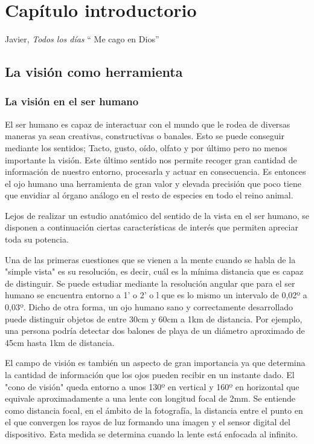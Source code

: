 \chapter{ Capítulo introductorio}

\begin{chapquote}{Javier, \textit{Todos los días}}
`` Me cago en Dios''
\end{chapquote}

\section{La visión como herramienta}

\subsection{La visión en el ser humano}
El ser humano es capaz de interactuar con el mundo que le rodea de diversas maneras ya sean creativas, constructivas o banales. Esto se puede conseguir mediante los sentidos; Tacto, gusto, oído, olfato y por último pero no menos importante la visión. Este último sentido nos permite recoger gran cantidad de información de nuestro entorno, procesarla y actuar en consecuencia. Es entonces el ojo humano una herramienta de gran valor y elevada precisión que poco tiene que envidiar al órgano análogo en el resto de especies en todo el reino animal. 

Lejos de realizar un estudio anatómico del sentido de la vista en el ser humano, se disponen a continuación ciertas características de interés que permiten apreciar toda su potencia.

Una de las primeras cuestiones que se vienen a la mente cuando se habla de la "simple vista" es su resolución, es decir, cuál es la mínima distancia que es capaz de distinguir. Se puede estudiar mediante la resolución angular que para el ser humano se encuentra entorno a 1' o 2' o l que es lo mismo un intervalo de 0,02º a 0,03º\cite{simple_vista}. Dicho de otra forma, un ojo humano sano y correctamente desarrollado puede distinguir objetos de entre 30cm y 60cm a 1km de distancia. Por ejemplo, una persona podría detectar dos balones de playa de un diámetro aproximado de 45cm hasta 1km de distancia.


El campo de visión es también un aspecto de gran importancia ya que determina la cantidad de información que los ojos pueden recibir en un instante dado. El "cono de visión" queda entorno a unos 130º en vertical y 160º en horizontal que equivale aproximadamente a una lente con longitud focal de 2mm\cite{angle_of_view}. Se entiende como distancia focal, en el ámbito de la fotografía, la distancia entre el punto en el que convergen los rayos de luz formando una imagen y el sensor digital del dispositivo. Esta medida se determina cuando la lente está enfocada al infinito.

